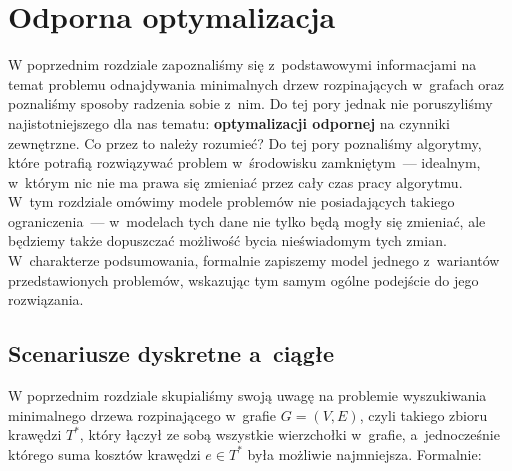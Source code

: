 \chapter{Odporna optymalizacja}\label{ch:minmax}
\thispagestyle{chapterBeginStyle}





W poprzednim rozdziale zapoznaliśmy się z~podstawowymi informacjami na temat problemu odnajdywania minimalnych drzew rozpinających w~grafach oraz poznaliśmy sposoby radzenia sobie z~nim.
Do tej pory jednak nie poruszyliśmy najistotniejszego dla nas tematu: \textbf{optymalizacji odpornej} na czynniki zewnętrzne.
Co przez to należy rozumieć?
Do tej pory poznaliśmy algorytmy, które potrafią rozwiązywać problem w~środowisku zamkniętym~--- idealnym, w~którym nic nie ma prawa się zmieniać przez cały czas pracy algorytmu.
W~tym rozdziale omówimy modele problemów nie posiadających takiego ograniczenia~--- w~modelach tych dane nie tylko będą mogły się zmieniać, ale będziemy także dopuszczać możliwość bycia nieświadomym tych zmian.
W~charakterze podsumowania, formalnie zapiszemy model jednego z~wariantów przedstawionych problemów, wskazując tym samym ogólne podejście do jego rozwiązania.




\section{Scenariusze dyskretne a~ciągłe}




W poprzednim rozdziale skupialiśmy swoją uwagę na problemie wyszukiwania minimalnego drzewa rozpinającego w~grafie $G = \left( V, E \right)$, czyli takiego zbioru krawędzi $T^{\ast}$, który łączył ze sobą wszystkie wierzchołki w~grafie, a~jednocześnie którego suma kosztów krawędzi $e \in T^{\ast}$ była możliwie najmniejsza.
Formalnie:

